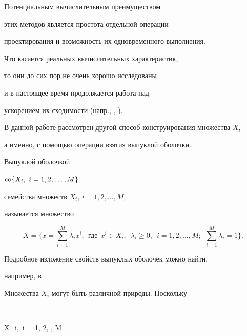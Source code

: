 Потенциальным вычислительным преимуществом 


этих методов является простота отдельной операции


проектирования и возможность их одновременного выполнения.


Что касается реальных вычислительных характеристик, 


то они до сих пор не очень хорошо исследованы


и в настоящее время продолжается работа над 


ускорением их сходимости (напр., \cite{combz}, \cite{incom}).





В данной работе рассмотрен другой способ конструирования множества $X$,


а именно, с помощью операции взятия выпуклой оболочки.





\begin{defn}


Выпуклой оболочкой


$\operatorname{co}\lbrace X_i, \ i = 1, 2, \dotsc, M \rbrace$


семейства множеств $X_i$, $i = 1, 2, \dotsc, M$,


называется множество


\begin{equation}\label{con}


X = \bigg\{x = \sum_{i=1}^M \lambda_i x^i,


\ \ \text{где} \ \ x^i \in X_i,\ \; \lambda_i \geq 0,


\ \; i = 1, 2, \dotsc, M;


\ \ \sum_{i=1}^M \lambda_i  = 1 \bigg\}.


\end{equation}


\end{defn}





Подробное изложение свойств выпуклых оболочек можно найти, 


например, в \cite{liht}.





Множества $X_i$ могут быть различной природы. Поскольку


$$


\co \lbrace X_i,\ i = 1, 2, \dotsc, M \rbrace =


